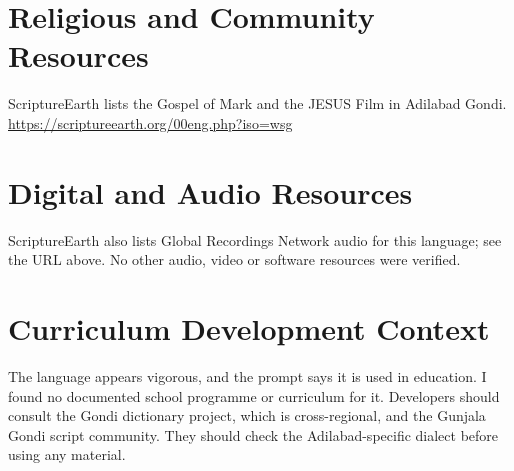 \documentclass[12pt]{article}
\begin{document}
\section{Religious and Community Resources}
ScriptureEarth lists the Gospel of Mark and the JESUS Film in Adilabad Gondi. \url{https://scriptureearth.org/00eng.php?iso=wsg}

\section{Digital and Audio Resources}
ScriptureEarth also lists Global Recordings Network audio for this language; see the URL above. No other audio, video or software resources were verified.

\section{Curriculum Development Context}
The language appears vigorous, and the prompt says it is used in education. I found no documented school programme or curriculum for it. Developers should consult the Gondi dictionary project, which is cross-regional, and the Gunjala Gondi script community. They should check the Adilabad-specific dialect before using any material.
\end{document}
